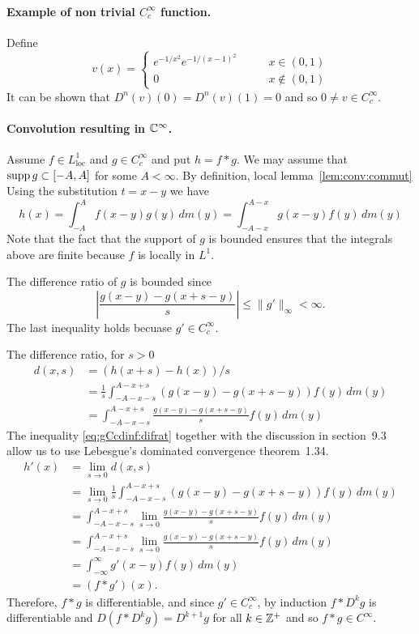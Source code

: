 \begin{enumerate}
\paragraph{Example of non trivial \(C_c^\infty\) function.}
Define
\begin{equation*}
v(x) = \left\{
\begin{array}{ll}
e^{-1/x^2}e^{-1/(x-1)^2} \qquad &x\in(0,1) \\
0 & x \notin (0,1)
\end{array}
\right.
\end{equation*}
It can be shown that \(D^n(v)(0) = D^n(v)(1) = 0\) and so 
\(0\neq v \in C_c^\infty\).

\paragraph{Convolution resulting in \(\mathbb{C}^\infty\).}
Assume \(f\in L_{\textrm{loc}}^1\) and \(g\in C_c^\infty\)
and put \(h = f\ast g\). We may assume that \(\mathop{\rm supp}\nolimits g \subset [-A,A]\)
for some \(A < \infty\).
By definition, local lemma~\ref{lem:conv:commut}
Using the substitution \(t=x-y\) we have
\begin{equation*}
h(x) = \int_{-A}^A f(x-y)g(y)\,dm(y) = \int_{-A-x}^{A-x} g(x-y)f(y)\,dm(y)
\end{equation*}
Note that the fact that the support of $g$ is bounded
ensures that the integrals above are finite because 
$f$ is locally in \(L^1\).

The difference ratio of $g$ is bounded since 
\begin{equation} \label{eq:gCcdinf:difrat}
\left|\frac{g(x-y)-g(x+s-y)}{s}\right| \leq \|g'\|_\infty < \infty.
\end{equation}
The last inequality holds becuase \(g'\in C_c^\infty\).

The difference ratio, for \(s>0\)
\begin{align*}
d(x,s) 
&= (h(x+s)-h(x))/s \\
&= \frac{1}{s}\int_{-A-x-s}^{A-x+s} (g(x-y)-g(x+s-y))f(y)\,dm(y) \\
&= \int_{-A-x-s}^{A-x+s} \frac{g(x-y)-g(x+s-y)}{s}f(y)\,dm(y) 
\end{align*}
The inequality \eqref{eq:gCcdinf:difrat} 
together with the discussion in section~9.3
allow us to use Lebesgue's dominated convergence theorem~1.34.
\begin{align*}
h'(x)
&= \lim_{s\to 0}d(x,s) \\
&= \lim_{s\to 0} \frac{1}{s}\int_{-A-x-s}^{A-x+s} (g(x-y)-g(x+s-y))f(y)\,dm(y) \\
&= \int_{-A-x-s}^{A-x+s} \lim_{s\to 0} \frac{g(x-y)-g(x+s-y)}{s}f(y)\,dm(y) \\
&= \int_{-A-x-s}^{A-x+s} \lim_{s\to 0} \frac{g(x-y)-g(x+s-y)}{s}f(y)\,dm(y) \\
&= \int_{-\infty}^\infty g'(x-y)f(y)\,dm(y) \\
&= (f \ast g')(x).
\end{align*}
Therefore, \(f \ast g\) is differentiable, and 
since \(g'\in C_c^\infty\), by induction  
\(f \ast D^kg\) is differentiable
and \(D(f \ast D^kg) = D^{k+1}g\) for all \(k\in\mathbb{Z}^+\) and so 
\(f \ast g \in C^\infty\).



\end{enumerate}
